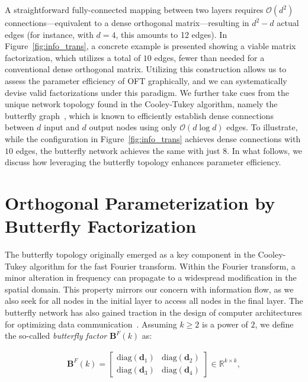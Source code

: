 A straightforward fully-connected mapping between two layers requires $\mathcal{O}(d^2)$ connections—equivalent to a dense orthogonal matrix—resulting in $d^2-d$ actual edges (for instance, with $d=4$, this amounts to 12 edges). In Figure~\ref{fig:info_trans}, a concrete example is presented showing a viable matrix factorization, which utilizes a total of $10$ edges, fewer than needed for a conventional dense orthogonal matrix. Utilizing this construction allows us to assess the parameter efficiency of OFT graphically, and we can systematically devise valid factorizations under this paradigm. We further take cues from the unique network topology found in the Cooley-Tukey algorithm, namely the butterfly graph~\cite{cooley1965algorithm}, which is known to efficiently establish dense connections between $d$ input and $d$ output nodes using only $\mathcal{O}(d\log d)$ edges. To illustrate, while the configuration in Figure~\ref{fig:info_trans} achieves dense connections with $10$ edges, the butterfly network achieves the same with just $8$. In what follows, we discuss how leveraging the butterfly topology enhances parameter efficiency.

\section{Orthogonal Parameterization by Butterfly Factorization}

The butterfly topology originally emerged as a key component in the Cooley-Tukey algorithm for the fast Fourier transform. Within the Fourier transform, a minor alteration in frequency can propagate to a widespread modification in the spatial domain. This property mirrors our concern with information flow, as we also seek for all nodes in the initial layer to access all nodes in the final layer. The butterfly network has also gained traction in the design of computer architectures for optimizing data communication~\cite{solihin2015fundamentals,li2011linear}. Assuming $k\geq 2$ is a power of $2$, we define the so-called \emph{butterfly factor} $\bm{B}^F(k)$ as:

\begin{equation}\label{eq:but_factor}
\begin{aligned}
    \bm{B}^F(k)=\begin{bmatrix}
    \text{diag}(\bm{d}_1) & \text{diag}(\bm{d}_2) \\
    \text{diag}(\bm{d}_3) & \text{diag}(\bm{d}_4)
    \end{bmatrix}\in\mathbb{R}^{k\times k},
\end{aligned}
\end{equation}

